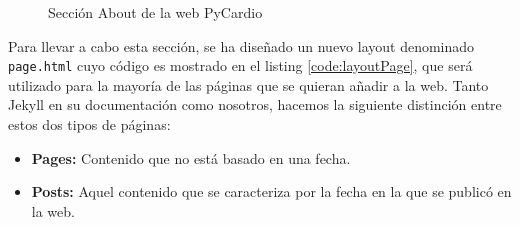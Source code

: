 \begin{figure}[H]
    \centering
    \caption{Sección About de la web PyCardio}
    \label{fig:aboutWeb}
\end{figure}

Para llevar a cabo esta sección, se ha diseñado un nuevo layout denominado \texttt{page.html} cuyo código es mostrado en el listing \ref{code:layoutPage}, que será utilizado para la mayoría de las páginas que se quieran añadir a la web. Tanto Jekyll en su documentación como nosotros, hacemos la siguiente distinción entre estos dos tipos de páginas:

\begin{itemize}
    \item \textbf{Pages: } Contenido que no está basado en una fecha.
    \item \textbf{Posts: } Aquel contenido que se caracteriza por la fecha en la que se publicó en la web.
\end{itemize}

